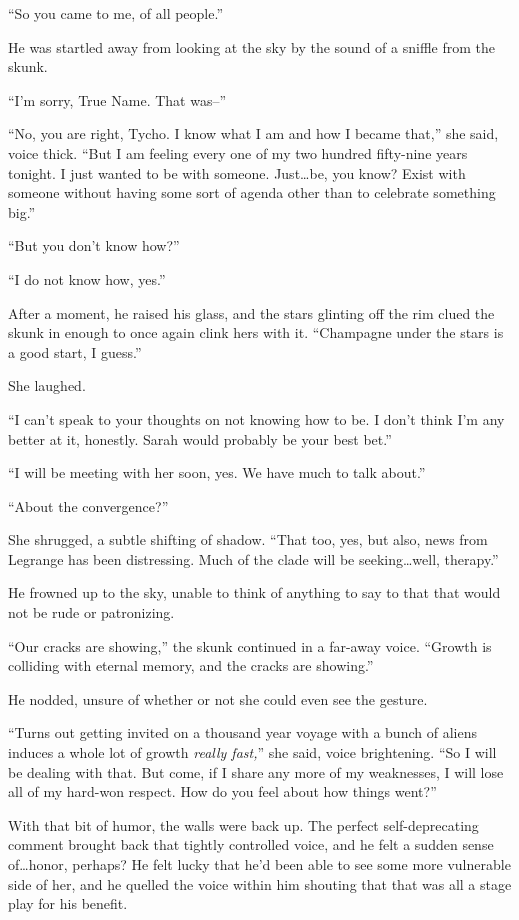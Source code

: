 ``So you came to me, of all people.''

He was startled away from looking at the sky by the sound of a sniffle from the skunk.

``I'm sorry, True Name. That was--''

``No, you are right, Tycho. I know what I am and how I became that,'' she said, voice thick. ``But I am feeling every one of my two hundred fifty-nine years tonight. I just wanted to be with someone. Just\ldots be, you know? Exist with someone without having some sort of agenda other than to celebrate something big.''

``But you don't know how?''

``I do not know how, yes.''

After a moment, he raised his glass, and the stars glinting off the rim clued the skunk in enough to once again clink hers with it. ``Champagne under the stars is a good start, I guess.''

She laughed.

``I can't speak to your thoughts on not knowing how to be. I don't think I'm any better at it, honestly. Sarah would probably be your best bet.''

``I will be meeting with her soon, yes. We have much to talk about.''

``About the convergence?''

She shrugged, a subtle shifting of shadow. ``That too, yes, but also, news from Legrange has been distressing. Much of the clade will be seeking\ldots well, therapy.''

He frowned up to the sky, unable to think of anything to say to that that would not be rude or patronizing.

``Our cracks are showing,'' the skunk continued in a far-away voice. ``Growth is colliding with eternal memory, and the cracks are showing.''

He nodded, unsure of whether or not she could even see the gesture.

``Turns out getting invited on a thousand year voyage with a bunch of aliens induces a whole lot of growth \emph{really fast,}'' she said, voice brightening. ``So I will be dealing with that. But come, if I share any more of my weaknesses, I will lose all of my hard-won respect. How do you feel about how things went?''

With that bit of humor, the walls were back up. The perfect self-deprecating comment brought back that tightly controlled voice, and he felt a sudden sense of\ldots honor, perhaps? He felt lucky that he'd been able to see some more vulnerable side of her, and he quelled the voice within him shouting that that was all a stage play for his benefit.

